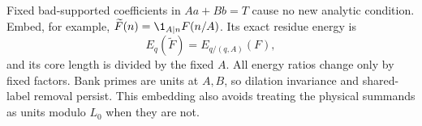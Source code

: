 Fixed bad-supported coefficients in \(Aa+Bb=T\) cause no new
analytic condition.  Embed, for example,
\(\widetilde F(n)=\1_{A\mid n}F(n/A)\).
Its exact residue energy is
\[
                  E_q(\widetilde F)=E_{q/(q,A)}(F),
\]
and its core length is divided by the fixed \(A\).
All energy ratios change only by fixed factors.
Bank primes are units at \(A,B\), so dilation invariance and
shared-label removal persist.  This embedding also avoids treating
the physical summands as units modulo \(L_0\) when they are not.
